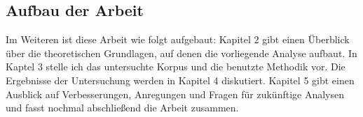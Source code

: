 \begin{comment}
"...foreign words may serve as an eye-catching device in texts written predominantly in Chinese"

Topics:
fashion
computers

\end{comment}

\subsection{Aufbau der Arbeit}

Im Weiteren ist diese Arbeit wie folgt aufgebaut:
Kapitel 2 gibt einen Überblick über die theoretischen Grundlagen, auf denen die vorliegende Analyse aufbaut.
In Kaptel 3 stelle ich das untersuchte Korpus und die benutzte Methodik vor.
Die Ergebnisse der Untersuchung werden in Kapitel 4 diskutiert.
Kapitel 5 gibt einen Ausblick auf Verbesserungen, Anregungen und Fragen für zukünftige Analysen und fasst nochmal abschließend die Arbeit zusammen.

